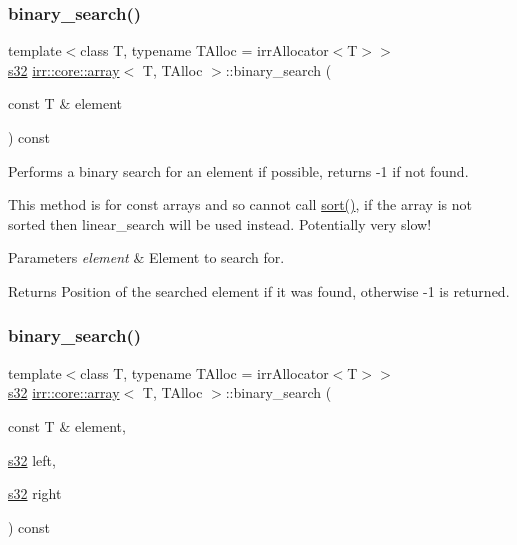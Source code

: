\subsubsection{\texorpdfstring{binary\+\_\+search()}{binary\_search()}\hspace{0.1cm}{\footnotesize\ttfamily [2/3]}}
{\footnotesize\ttfamily template$<$class T, typename T\+Alloc = irr\+Allocator$<$\+T$>$$>$ \\
\hyperlink{namespaceirr_ac66849b7a6ed16e30ebede579f9b47c6}{s32} \hyperlink{classirr_1_1core_1_1array}{irr\+::core\+::array}$<$ T, T\+Alloc $>$\+::binary\+\_\+search (\begin{DoxyParamCaption}\item[{const T \&}]{element }\end{DoxyParamCaption}) const\hspace{0.3cm}{\ttfamily [inline]}}



Performs a binary search for an element if possible, returns -\/1 if not found. 

This method is for const arrays and so cannot call \hyperlink{classirr_1_1core_1_1array_a870e52dd57dd67a9d59e5ca5f82bca94}{sort()}, if the array is not sorted then linear\+\_\+search will be used instead. Potentially very slow! 
\begin{DoxyParams}{Parameters}
{\em element} & Element to search for. \\
\hline
\end{DoxyParams}
\begin{DoxyReturn}{Returns}
Position of the searched element if it was found, otherwise -\/1 is returned. 
\end{DoxyReturn}
\mbox{\label{classirr_1_1core_1_1array_a9f3d6ee26c52d2e231446e4069a765a3}} 
\subsubsection{\texorpdfstring{binary\+\_\+search()}{binary\_search()}\hspace{0.1cm}{\footnotesize\ttfamily [3/3]}}
{\footnotesize\ttfamily template$<$class T, typename T\+Alloc = irr\+Allocator$<$\+T$>$$>$ \\
\hyperlink{namespaceirr_ac66849b7a6ed16e30ebede579f9b47c6}{s32} \hyperlink{classirr_1_1core_1_1array}{irr\+::core\+::array}$<$ T, T\+Alloc $>$\+::binary\+\_\+search (\begin{DoxyParamCaption}\item[{const T \&}]{element,  }\item[{\hyperlink{namespaceirr_ac66849b7a6ed16e30ebede579f9b47c6}{s32}}]{left,  }\item[{\hyperlink{namespaceirr_ac66849b7a6ed16e30ebede579f9b47c6}{s32}}]{right }\end{DoxyParamCaption}) const\hspace{0.3cm}{\ttfamily [inline]}}



